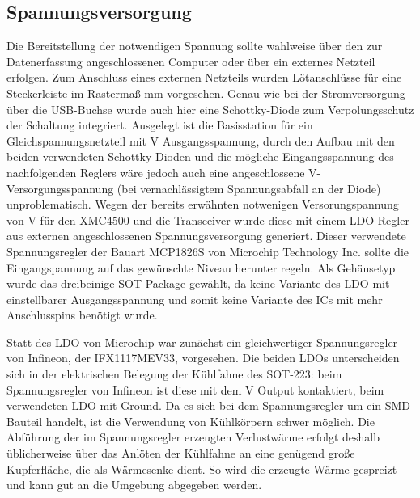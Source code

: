 \subsection{Spannungsversorgung}
Die Bereitstellung der notwendigen Spannung sollte wahlweise über den zur Datenerfassung angeschlossenen Computer oder über ein externes Netzteil erfolgen. Zum Anschluss eines externen Netzteils wurden Lötanschlüsse für eine Steckerleiste im Rastermaß \unit[2,54]{mm} vorgesehen. Genau wie bei der Stromversorgung über die USB-Buchse wurde auch hier eine Schottky-Diode zum Verpolungsschutz der Schaltung integriert. Ausgelegt ist die Basisstation für ein Gleichspannungsnetzteil mit \unit[5]{V} Ausgangsspannung, durch den Aufbau mit den beiden verwendeten Schottky-Dioden und die mögliche Eingangsspannung des nachfolgenden Reglers wäre jedoch auch eine angeschlossene \unit[6]{V}-Versorgungsspannung (bei vernachlässigtem Spannungsabfall an der Diode) unproblematisch.
Wegen der bereits erwähnten notwenigen Versorungspannung von \unit[3,3]{V} für den XMC4500 und die Transceiver wurde diese mit einem \ac{LDO}-Regler aus externen angeschlossenen Spannungsversorgung generiert. Dieser verwendete Spannungsregler der Bauart MCP1826S von Microchip Technology Inc. sollte die Eingangspannung auf das gewünschte Niveau herunter regeln.
Als Gehäusetyp wurde das dreibeinige \ac{SOT}-Package gewählt, da keine Variante des \ac{LDO} mit einstellbarer Ausgangsspannung und somit keine Variante des \acp{IC} mit mehr Anschlusspins benötigt wurde.

Statt des \ac{LDO} von Microchip war zunächst ein gleichwertiger Spannungsregler von Infineon, der IFX1117MEV33, vorgesehen. Die beiden \acp{LDO} unterscheiden sich in der elektrischen Belegung der Kühlfahne des \ac{SOT}-223: beim Spannungsregler von Infineon ist diese mit dem \unit[3,3]{V} Output kontaktiert, beim verwendeten \ac{LDO} mit Ground. Da es sich bei dem Spannungsregler um ein \ac{SMD}-Bauteil handelt, ist die Verwendung von Kühlkörpern schwer möglich. Die Abführung der im Spannungsregler erzeugten Verlustwärme erfolgt deshalb üblicherweise über das Anlöten der Kühlfahne an eine genügend große Kupferfläche, die als Wärmesenke dient. So wird die erzeugte Wärme gespreizt und kann gut an die Umgebung abgegeben werden. 

